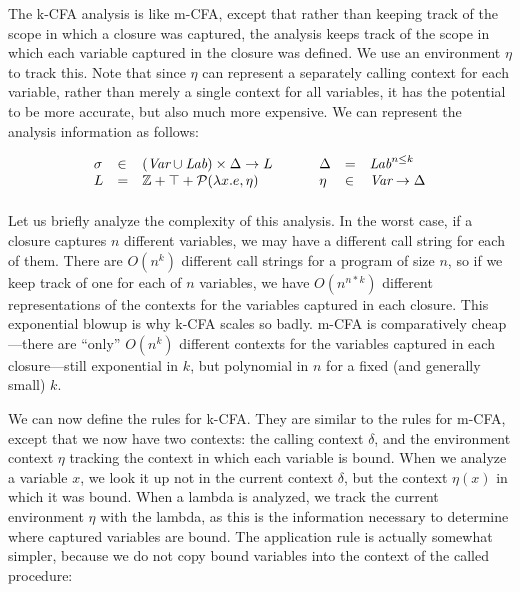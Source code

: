 \documentclass[11pt]{article}
\def\Integer{\mathbb{Z}}
\newcommand{\todo}[1]{}
\begin{document}
The k-CFA analysis is like m-CFA, except that rather than keeping track of the scope in which a closure was captured, the analysis keeps track of the scope in which each variable captured in the closure was defined.  We use an environment $\eta$ to track this.  Note that since $\eta$ can represent a separately calling context for each variable, rather than merely a single context for all variables, it has the potential to be more accurate, but also much more expensive.  We can represent the analysis information as follows:

\todo{give an example of this abstraction, and others}

\[
\begin{array}{lllllll}

\sigma & \in & (\textit{Var} \cup \textit{Lab}) \cross \Delta \rightarrow L & ~~~~ & 
\Delta & = & \textit{Lab}^{n \leq k} \\
L & = & \Integer + \top + \mathcal{P}(\lambda x . e, \eta) & ~~~~ &
\eta & \in & \textit{Var} \rightarrow \Delta \\[1ex]

\end{array}
\]

Let us briefly analyze the complexity of this analysis.  In the worst case, if a closure captures $n$ different variables, we may have a different call string for each of them.  There are $O(n^k)$ different call strings for a program of size $n$, so if we keep track of one for each of $n$ variables, we have $O(n^{n*k})$ different representations of the contexts for the variables captured in each closure.  This exponential blowup is why k-CFA scales so badly.  m-CFA is comparatively cheap---there are ``only'' $O(n^k)$ different contexts for the variables captured in each closure---still exponential in $k$, but polynomial in $n$ for a fixed (and generally small) $k$.

We can now define the rules for k-CFA.  They are similar to the rules for m-CFA, except that we now have two contexts: the calling context $\delta$, and the environment context $\eta$ tracking the context in which each variable is bound.  When we analyze a variable $x$, we look it up not in the current context $\delta$, but the context $\eta(x)$ in which it was bound.  When a lambda is analyzed, we track the current environment $\eta$ with the lambda, as this is the information necessary to determine where captured variables are bound.  The application rule is actually somewhat simpler, because we do not copy bound variables into the context of the called procedure:
\end{document}
